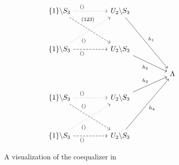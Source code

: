 \begin{exmp}
\begin{figure}
\[
\begin{tikzcd}
\{1\} \backslash S_3 \arrow[rr, "()" near start, dotted] \arrow[rrdd, "(123)" near start, dashed]   &  & U_2 \backslash S_3 \arrow[rrddd, "h_1"] &  &         \\
                                                                                     &  &                              &  &         \\
\{1\} \backslash S_3 \arrow[rruu, "()"' near start, dotted] \arrow[rr, "()"' near start, dashed]    &  & U_2 \backslash S_3 \arrow[rrd, "h_2"']   &  &         \\
                                                                                     &  &                              &  & \Lambda \\
\{1\} \backslash S_3 \arrow[rr, "()" near start, dotted] \arrow[rrdd, "()" near start, dashed]      &  & U_2 \backslash S_3 \arrow[rru, "h_3"]   &  &         \\
                                                                                     &  &                              &  &         \\
\{1\} \backslash S_3 \arrow[rruu, "()"' near start, dotted] \arrow[rr, "()"' near start, dashed]    &  & U_2 \backslash S_3 \arrow[rruuu, "h_4"'] &  &        
\end{tikzcd}
\]
\caption{A visualization of the coequalizer in }\label{fig:exmp:coequalizers_in_skeletal_G_sets_1_coequalizer}
\end{figure}

\end{exmp}
